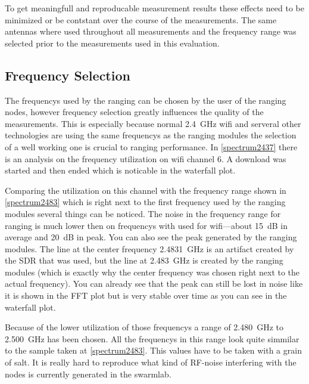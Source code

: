 To get meaningfull and reproducable measurement results these effects need to be minimized or be contstant over the course of the measurements.
The same antennas where used throughout all measurements and the frequency range was selected prior to the measurements used in this evaluation.

\subsection{Frequency Selection}
\label{freqencyselection}
The frequencys used by the ranging can be chosen by the user of the ranging nodes,
however frequency selection greatly influences the quality of the measurements.
This is especially because normal \SI{2.4}{\giga\hertz} wifi and serveral other technologies are using the same frequencys as the ranging modules the selection of a well working one is crucial to ranging performance.
In \autoref{spectrum2437} there is an analysis on the frequency utilization on wifi channel 6.
A download was started and then ended which is noticable in the waterfall plot.

Comparing the utilization on this channel with the frequency range shown in \autoref{spectrum2483} which is right next to the first frequency used by the ranging modules several things can be noticed.
The noise in the frequency range for ranging is much lower then on frequencys with used for wifi—about \SI{15}{dB} in average and \SI{20}{dB} in peak.
You can also see the peak generated by the ranging modules.
The line at the center frequency \SI{2.4831}{\giga\hertz} is an artifact created by the SDR that was used, but the line at \SI{2.483}{\giga\hertz} is created by the ranging modules (which is exactly why the center frequency was chosen right next to the actual frequency).
You can already see that the peak can still be lost in noise like it is shown in the FFT plot but is very stable over time as you can see in the waterfall plot.

Because of the lower utilization of those frequencys a range of \SI{2.480}{\giga\hertz} to \SI{2.500}{\giga\hertz} has been chosen.
All the frequencys in this range look quite simmilar to the sample taken at \autoref{spectrum2483}.
This values have to be taken with a grain of salt.
It is really hard to reproduce what kind of RF-noise interfering with the nodes is currently generated in the swarmlab.


